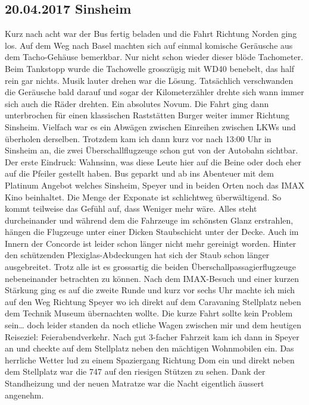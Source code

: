 \subsection{20.04.2017 Sinsheim }
Kurz nach acht war der Bus fertig beladen und die Fahrt Richtung Norden ging los.
Auf dem Weg nach Basel machten sich auf einmal komische Geräusche aus dem Tacho-Gehäuse bemerkbar.
Nur nicht schon wieder dieser blöde Tachometer.
Beim Tankstopp wurde die Tachowelle grosszügig mit WD40 benebelt, das half rein gar nichts.
Musik lauter drehen war die Lösung.
Tatsächlich verschwanden die Geräusche bald darauf und sogar der Kilometerzähler drehte sich wann immer sich auch die Räder drehten.
Ein absolutes Novum.
Die Fahrt ging dann unterbrochen für einen klassischen Raststätten Burger weiter immer Richtung Sinsheim.
Vielfach war es ein Abwägen zwischen Einreihen zwischen LKWs und überholen derselben.
Trotzdem kam ich dann kurz vor nach 13:00 Uhr in Sinsheim an, die zwei Überschallflugzeuge schon gut von der Autobahn sichtbar.
Der erste Eindruck: Wahnsinn, was diese Leute hier auf die Beine oder doch eher auf die Pfeiler gestellt haben.
Bus geparkt und ab ins Abenteuer mit dem Platinum Angebot welches Sinsheim, Speyer und in beiden Orten noch das IMAX Kino beinhaltet.
Die Menge der Exponate ist schlichtweg überwältigend.
So kommt teilweise das Gefühl auf, dass Weniger mehr wäre.
Alles steht durcheinander und während dem die Fahrzeuge im schönsten Glanz erstrahlen, hängen die Flugzeuge unter einer Dicken Staubschicht unter der Decke.
Auch im Innern der Concorde ist leider schon länger nicht mehr gereinigt worden.
Hinter den schützenden Plexiglas-Abdeckungen hat sich der Staub schon länger ausgebreitet.
Trotz alle ist es grossartig die beiden Überschallpassagierflugzeuge nebeneinander betrachten zu können.
Nach dem IMAX-Besuch und einer kurzen Stärkung ging es auf die zweite Runde und kurz vor sechs Uhr machte ich mich auf den Weg Richtung Speyer wo ich direkt auf dem Caravaning Stellplatz neben dem Technik Museum übernachten wollte.
Die kurze Fahrt sollte kein Problem sein\dots{} doch leider standen da noch etliche Wagen zwischen mir und dem heutigen Reiseziel: Feierabendverkehr.
Nach gut 3-facher Fahrzeit kam ich dann in Speyer an und checkte auf dem Stellplatz neben den mächtigen Wohnmobilen ein.
Das herrliche Wetter lud zu einem Spaziergang Richtung Dom ein und direkt neben dem Stellplatz war die 747 auf den riesigen Stützen zu sehen.
Dank der Standheizung und der neuen Matratze war die Nacht eigentlich äussert angenehm. 

